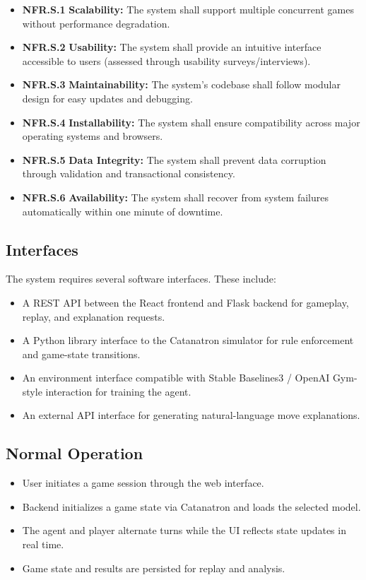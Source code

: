 \documentclass{article}
\begin{document}
\begin{itemize}
  \item \label{NFR.S.1}\textbf{NFR.S.1} \textbf{Scalability:} The system shall support multiple concurrent games without performance degradation.
  \item \label{NFR.S.2}\textbf{NFR.S.2} \textbf{Usability:} The system shall provide an intuitive interface accessible to users (assessed through usability surveys/interviews).
  \item \label{NFR.S.3}\textbf{NFR.S.3} \textbf{Maintainability:} The system's codebase shall follow modular design for easy updates and debugging.
  \item \label{NFR.S.4}\textbf{NFR.S.4} \textbf{Installability:} The system shall ensure compatibility across major operating systems and browsers.
  \item \label{NFR.S.5}\textbf{NFR.S.5} \textbf{Data Integrity:} The system shall prevent data corruption through validation and transactional consistency.
  \item \label{NFR.S.6}\textbf{NFR.S.6} \textbf{Availability:} The system shall recover from system failures automatically within one minute of downtime.
\end{itemize}


\subsection{Interfaces}\label{subsec:interfaces}


The system requires several software interfaces. These include:
\begin{itemize}
    \item A REST API between the React frontend and Flask backend for gameplay, replay, and explanation requests.
    \item A Python library interface to the Catanatron simulator for rule enforcement and game-state transitions.
    \item An \RL{} environment interface compatible with Stable Baselines3 / OpenAI Gym-style interaction for training the \RL{} agent.
    \item An external \LLM{} API interface for generating natural-language move explanations.
\end{itemize}


\subsection{Normal Operation}\label{subsec:normal-operation}
\begin{itemize}
    \item User initiates a game session through the web interface.
    \item Backend initializes a game state via Catanatron and loads the selected \AI{} model.
    \item The \AI{} agent and player alternate turns while the UI reflects state updates in real time.
    \item Game state and results are persisted for replay and analysis.
\end{itemize}
\end{document}
